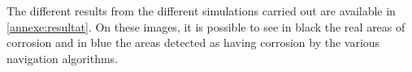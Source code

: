 
The different results from the different simulations carried out are available in \ref{annexe:resultat}.
On these images, it is possible to see in black the real areas of corrosion and in blue the areas detected as having corrosion by the various navigation algorithms.

